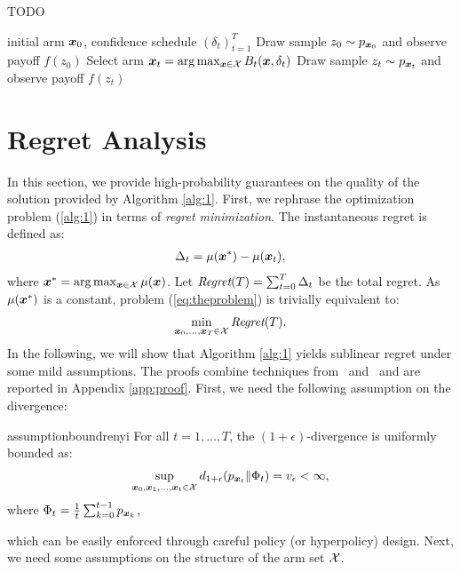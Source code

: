 \documentclass{article}
\makeatletter
\DeclareRobustCommand{\algoname}{TODO\@\xspace}
\makeatother
\begin{document}
\begin{algorithm}[t]
	\caption{\algoname}
	\label{alg:1}
	\begin{algorithmic}[1]
	 initial arm $\boldsymbol{x}_0$, confidence schedule $(\delta_t)_{t=1}^T$
	\STATE Draw sample $z_0\sim p_{\boldsymbol{x}_0}$ and observe payoff $f(z_0)$
		\STATE Select arm $\boldsymbol{x}_t = \arg\max_{\boldsymbol{x}\in\mathcal{X}}B_t(\boldsymbol{x},\delta_t)$
		\STATE Draw sample $z_t\sim p_{\boldsymbol{x}_t}$ and observe payoff $f(z_t)$
	\ENDFOR
	\end{algorithmic}
\end{algorithm}

\section{Regret Analysis}\label{sec:regret}
In this section, we provide high-probability guarantees on the quality of the solution provided by Algorithm \ref{alg:1}.
First, we rephrase the optimization problem (\ref{alg:1}) in terms of \textit{regret minimization}. The instantaneous regret is defined as:
\begin{align}\label{eq:inregret}
	\Delta_t = \mu(\boldsymbol{x}^*) - \mu(\boldsymbol{x}_t),
\end{align}
where $\boldsymbol{x}^* = \arg\max_{\boldsymbol{x}\in\mathcal{X}}\mu(\boldsymbol{x})$. Let $\textit{Regret}(T) = \sum_{t=0}^T\Delta_t$ be the total regret.
As $\mu(\boldsymbol{x}^*)$ is a constant, problem (\ref{eq:theproblem}) is trivially equivalent to:
\begin{align}\label{eq:regret}
	\min_{\boldsymbol{x}_0,\dots,\boldsymbol{x}_T\in\mathcal{X}} \textit{Regret}(T).
\end{align}
In the following, we will show that Algorithm \ref{alg:1} yields sublinear regret under some mild assumptions. The proofs combine techniques from~\citet{srinivas2009gaussian} and~\citet{bubeck2013bandits} and are reported in Appendix \ref{app:proof}.
First, we need the following assumption on the \Renyi divergence:
%
\begin{restatable}{assumption}{boundrenyi}\label{ass:boundrenyi}
	For all $t=1,\dots,T$, the $(1+\epsilon)$-\Renyi divergence is uniformly bounded as:
	\begin{align*}
		\sup_{\boldsymbol{x}_0,\boldsymbol{x}_1,\dots,\boldsymbol{x}_t\in\mathcal{X}}d_{1+\epsilon}(p_{\boldsymbol{x}_t}\|\Phi_t) = v_{\epsilon} < \infty,
	\end{align*}
	where $\Phi_t = \frac{1}{t}\sum_{k=0}^{t-1}p_{\boldsymbol{x}_k}$,
\end{restatable}
%
which can be easily enforced through careful policy (or hyperpolicy) design. Next, we need some assumptions on the structure of the arm set $\mathcal{X}$.
\end{document}
